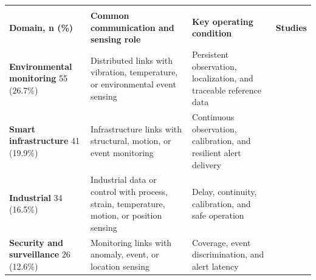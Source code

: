 \begin{table}[!t]
\vspace{3pt}
\begin{tabularx}{\textwidth}{@{}
>{\raggedright\arraybackslash}p{}
>{\raggedright\arraybackslash}p{}
>{\raggedright\arraybackslash}X
>{\centering\arraybackslash}p{}@{}}
\toprule
\multicolumn{4}{@{}l}{\emph{Infrastructure}} \\
\addlinespace[1pt]
\textbf{Domain, n (\%)} & \textbf{Common communication and sensing role} &
\textbf{Key operating condition} & \textbf{Studies} \\
\midrule
\textbf{Environmental monitoring} 55 (26.7\%) & Distributed links with vibration,
temperature, or environmental event sensing & Persistent observation,
localization, and traceable reference data &
\cite{OISAC_SCR00957,OISAC_SCR01006,OISAC_SCR01095} \\
\addlinespace[1.25pt]
\textbf{Smart infrastructure} 41 (19.9\%) & Infrastructure links with structural,
motion, or event monitoring & Continuous observation, calibration, and
resilient alert delivery & \cite{OISAC_SCR00277,OISAC_SCR00763,OISAC_SCR01006} \\
\addlinespace[1.25pt]
\textbf{Industrial} 34 (16.5\%) & Industrial data or control with process,
strain, temperature, motion, or position sensing & Delay, continuity,
calibration, and safe operation & \cite{OISAC_SCR00277,OISAC_SCR00376} \\
\addlinespace[1.25pt]
\textbf{Security and surveillance} 26 (12.6\%) & Monitoring links with anomaly,
event, or location sensing & Coverage, event discrimination, and alert latency &
\cite{OISAC_SCR01006} \\
\bottomrule
\end{tabularx}


\end{table}

